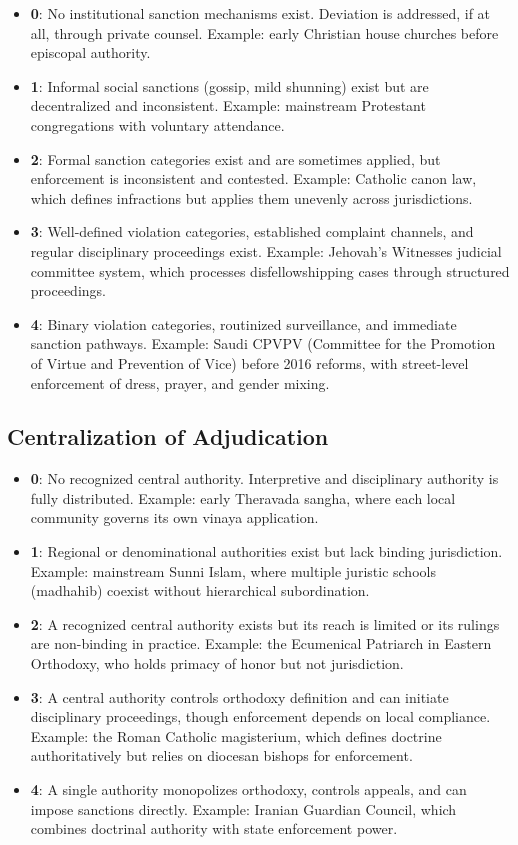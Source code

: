 \documentclass[12pt]{article}
\begin{document}
\begin{itemize}
\item \textbf{0}: No institutional sanction mechanisms exist. Deviation is addressed, if at all, through private counsel. Example: early Christian house churches before episcopal authority.
\item \textbf{1}: Informal social sanctions (gossip, mild shunning) exist but are decentralized and inconsistent. Example: mainstream Protestant congregations with voluntary attendance.
\item \textbf{2}: Formal sanction categories exist and are sometimes applied, but enforcement is inconsistent and contested. Example: Catholic canon law, which defines infractions but applies them unevenly across jurisdictions.
\item \textbf{3}: Well-defined violation categories, established complaint channels, and regular disciplinary proceedings exist. Example: Jehovah's Witnesses judicial committee system, which processes disfellowshipping cases through structured proceedings.
\item \textbf{4}: Binary violation categories, routinized surveillance, and immediate sanction pathways. Example: Saudi CPVPV (Committee for the Promotion of Virtue and Prevention of Vice) before 2016 reforms, with street-level enforcement of dress, prayer, and gender mixing.
\end{itemize}

\subsection{Centralization of Adjudication}

\begin{itemize}
\item \textbf{0}: No recognized central authority. Interpretive and disciplinary authority is fully distributed. Example: early Theravada sangha, where each local community governs its own vinaya application.
\item \textbf{1}: Regional or denominational authorities exist but lack binding jurisdiction. Example: mainstream Sunni Islam, where multiple juristic schools (madhahib) coexist without hierarchical subordination.
\item \textbf{2}: A recognized central authority exists but its reach is limited or its rulings are non-binding in practice. Example: the Ecumenical Patriarch in Eastern Orthodoxy, who holds primacy of honor but not jurisdiction.
\item \textbf{3}: A central authority controls orthodoxy definition and can initiate disciplinary proceedings, though enforcement depends on local compliance. Example: the Roman Catholic magisterium, which defines doctrine authoritatively but relies on diocesan bishops for enforcement.
\item \textbf{4}: A single authority monopolizes orthodoxy, controls appeals, and can impose sanctions directly. Example: Iranian Guardian Council, which combines doctrinal authority with state enforcement power.
\end{itemize}
\end{document}
